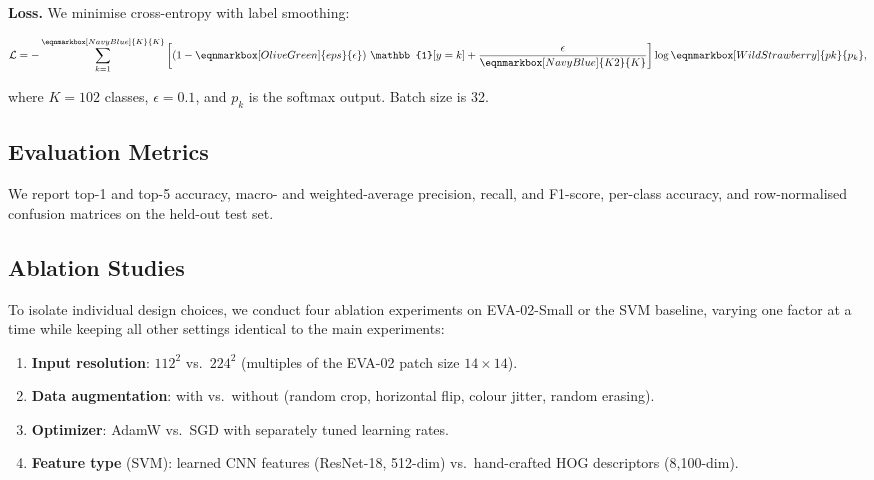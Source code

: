 \textbf{Loss.} We minimise cross-entropy with label smoothing:

\vspace{1em}
\begin{equation}
\label{eq:loss}
\mathcal{L} = -\sum_{k=1}^{\eqnmarkbox[NavyBlue]{K}{K}} \left[ \left(1-\eqnmarkbox[OliveGreen]{eps}{\epsilon}\right)\, \mathbb{1}[y=k] + \frac{\epsilon}{\eqnmarkbox[NavyBlue]{K2}{K}} \right] \log \eqnmarkbox[WildStrawberry]{pk}{p_k},
\end{equation}
\vspace{1em}

\noindent where $K{=}102$ classes, $\epsilon{=}0.1$, and $p_k$ is the softmax output. Batch size is 32.

\subsection{Evaluation Metrics}

We report top-1 and top-5 accuracy, macro- and weighted-average precision, recall, and F1-score, per-class accuracy, and row-normalised confusion matrices on the held-out test set.

\subsection{Ablation Studies}

To isolate individual design choices, we conduct four ablation experiments on EVA-02-Small or the SVM baseline, varying one factor at a time while keeping all other settings identical to the main experiments:

\begin{enumerate}[leftmargin=*, itemsep=2pt, topsep=4pt]
    \item \textbf{Input resolution}: $112^2$ vs.\ $224^2$ (multiples of the EVA-02 patch size $14{\times}14$).
    \item \textbf{Data augmentation}: with vs.\ without (random crop, horizontal flip, colour jitter, random erasing).
    \item \textbf{Optimizer}: AdamW vs.\ SGD with separately tuned learning rates.
    \item \textbf{Feature type} (SVM): learned CNN features (ResNet-18, 512-dim) vs.\ hand-crafted HOG descriptors (8{,}100-dim).
\end{enumerate}
